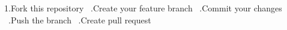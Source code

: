 1.\+Fork this repository ~.\+Create your feature branch ~.\+Commit your changes ~.\+Push the branch ~.\+Create pull request 